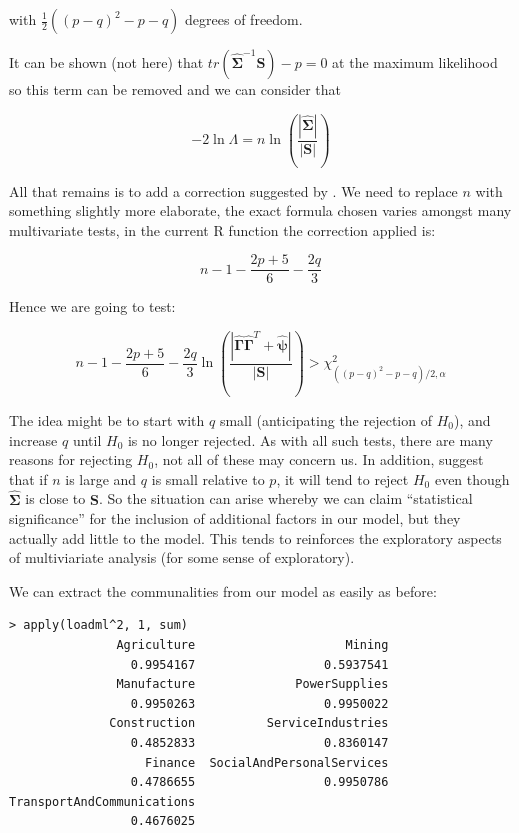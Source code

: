 with $\frac{1}{2} \left( (p-q)^{2} - p - q \right)$ degrees of freedom.

It can be shown (not here) that $ tr(\boldsymbol{\hat{\Sigma}}^{-1}\boldsymbol{S}) - p = 0$ at the maximum likelihood  so this term can be removed and we can consider that

\begin{equation}
\label{faqtest}
-2 \ln \Lambda = n \ln \left(  \frac{|\boldsymbol{\hat{\Sigma}}|}{|\boldsymbol{S}|} \right)
\end{equation}

All that remains is to add a correction suggested by \cite{Bartlett:1951,Bartlett:1954}.   We need to replace $n$ with something slightly more elaborate, the exact formula chosen varies amongst many multivariate tests, in the current R function the correction applied is:

\begin{displaymath}
n - 1 - \frac{2p + 5}{6} - \frac{2q}{3}
\end{displaymath}


Hence we are going to test:

\begin{equation}
n - 1 - \frac{2p + 5}{6} - \frac{2q}{3} \ln  \left(  \frac{|\boldsymbol{\hat{\Gamma}} \boldsymbol{\hat{\Gamma}}^{T} + \boldsymbol{\hat{\psi}}|}{|\boldsymbol{S}|} \right) > \chi^{2}_{\left((p-q)^{2} - p - q \right) / 2, \alpha}
\end{equation}

The idea might be to start with $q$ small (anticipating the rejection of $H_{0}$), and increase $q$ until $H_{0}$ is no longer rejected.   As with all such tests, there are many reasons for rejecting $H_{0}$, not all of these may concern us.   In addition, \cite{Johnson+Wichern:2002} suggest that if $n$ is large and $q$ is small relative to $p$, it will tend to reject $H_{0}$ even though $\boldsymbol{\hat{\Sigma}}$ is close to $\boldsymbol{S}$.  So the situation can arise whereby we can claim ``statistical significance'' for the inclusion of additional factors in our model, but they actually add little to the model.   This tends to reinforces the exploratory aspects of multiviariate analysis (for some sense of exploratory).

We can extract the communalities from our model as easily as before:

\singlespacing
\begin{verbatim}
> apply(loadml^2, 1, sum)
               Agriculture                     Mining 
                 0.9954167                  0.5937541 
               Manufacture              PowerSupplies 
                 0.9950263                  0.9950022 
              Construction          ServiceIndustries 
                 0.4852833                  0.8360147 
                   Finance  SocialAndPersonalServices 
                 0.4786655                  0.9950786 
TransportAndCommunications 
                 0.4676025 
\end{verbatim}
\onehalfspacing

